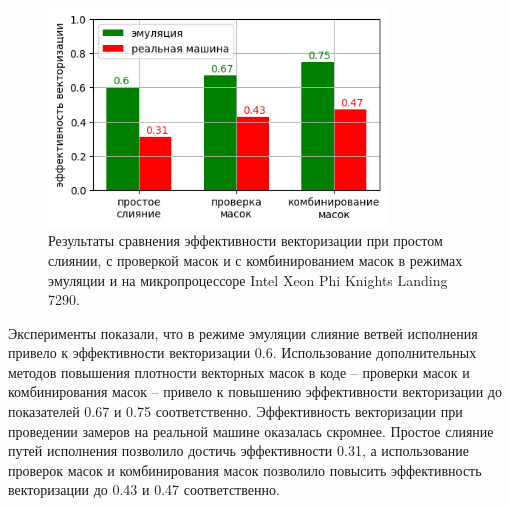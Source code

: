 \begin{figure}[ht]
	\centering
		\includegraphics[width=0.8\textwidth]{./pics/text_4_vec_comb_mask/res.png}
	\caption{Результаты сравнения эффективности векторизации при простом слиянии, с проверкой масок и с комбинированием масок в режимах эмуляции и на микропроцессоре Intel Xeon Phi Knights Landing 7290.}
	\label{fig:text_4_vec_comb_mask_res}
\end{figure}

Эксперименты показали, что в режиме эмуляции слияние ветвей исполнения привело к эффективности векторизации 0.6.
Использование дополнительных методов повышения плотности векторных масок в коде -- проверки масок и комбинирования масок -- привело к повышению эффективности векторизации до показателей 0.67 и 0.75 соответственно.
Эффективность векторизации при проведении замеров на реальной машине оказалась скромнее.
Простое слияние путей исполнения позволило достичь эффективности 0.31, а использование проверок масок и комбинирования масок позволило повысить эффективность векторизации до 0.43 и 0.47 соответственно.
